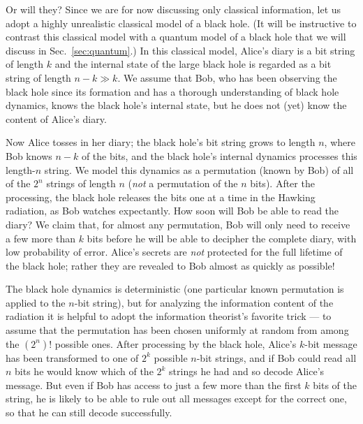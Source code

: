 \documentclass[12pt]{article}
\begin{document}
Or will they? Since we are for now discussing only classical information, let us adopt a highly unrealistic classical model of a black hole. (It will be instructive to contrast this classical model with a quantum model of a black hole that we will discuss in Sec.~\ref{sec:quantum}.) In this classical model, Alice's diary is a bit string of length $k$ and the internal state of the large black hole is regarded as a bit string of length $n-k \gg k$.  We assume that Bob, who has been observing the black hole since its formation and has a thorough understanding of black hole dynamics, knows the black hole's internal state, but he does not (yet) know the content of Alice's diary.

Now Alice tosses in her diary; the black hole's bit string grows to length $n$, where Bob knows $n-k$ of the bits, and the black hole's internal dynamics processes this length-$n$ string. We model this dynamics as a permutation (known by Bob) of all of the $2^n$ strings of length $n$ ({\em not} a permutation of the $n$ bits). After the processing, the black hole releases the bits one at a time in the Hawking radiation, as Bob watches expectantly. How soon will Bob be able to read the diary? We claim that, for almost any permutation, Bob will only need to receive a few more than $k$ bits before he will be able to decipher the complete diary, with low probability of error. Alice's secrets are {\em not} protected for the full lifetime of the black hole; rather they are revealed to Bob almost as quickly as possible! 

The black hole dynamics is deterministic (one particular known permutation is applied to the $n$-bit string), but for analyzing the information content of the radiation it is helpful to adopt the information theorist's favorite trick --- to assume that the permutation has been chosen uniformly at random from among the $\left(2^n\right)!$ possible ones. After processing by the black hole, Alice's $k$-bit message has been transformed to one of $2^k$ possible $n$-bit strings, and if Bob could read all $n$ bits he would know which of the $2^k$ strings he had and so decode Alice's message. But even if Bob has access to just a few more than the first $k$ bits of the string, he is likely to be able to rule out all messages except for the correct one, so that he can still decode successfully.
\end{document}
